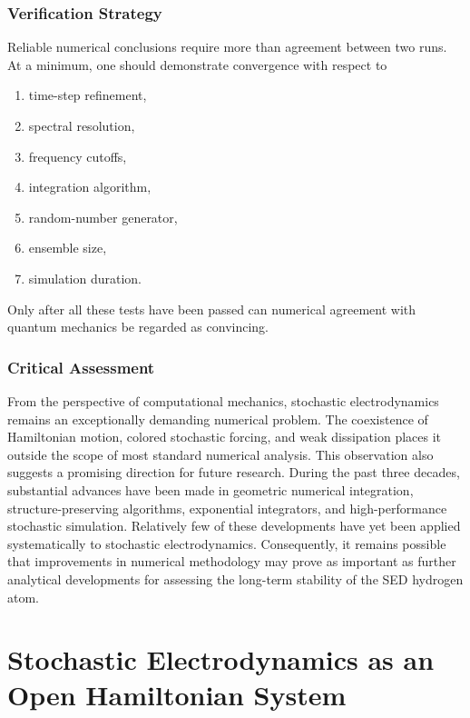 \subsection{Verification Strategy}
Reliable numerical conclusions require more than agreement between two
runs.
At a minimum,
one should demonstrate convergence with respect to
\begin{enumerate}
\item
time-step refinement,
\item
spectral resolution,
\item
frequency cutoffs,
\item
integration algorithm,
\item
random-number generator,
\item
ensemble size,
\item
simulation duration.
\end{enumerate}
Only after all these tests have been passed can numerical agreement with
quantum mechanics be regarded as convincing.
\subsection*{Critical Assessment}
From the perspective of computational mechanics, stochastic
electrodynamics remains an exceptionally demanding numerical problem.
The coexistence of Hamiltonian motion, colored stochastic forcing, and
weak dissipation places it outside the scope of most standard numerical
analysis.
This observation also suggests a promising direction for future
research. During the past three decades, substantial advances have been
made in geometric numerical integration, structure-preserving
algorithms, exponential integrators, and high-performance stochastic
simulation. Relatively few of these developments have yet been applied
systematically to stochastic electrodynamics.
Consequently, it remains possible that improvements in numerical
methodology may prove as important as further analytical developments
for assessing the long-term stability of the SED hydrogen atom.
\chapter{Stochastic Electrodynamics as an Open Hamiltonian System}
\label{ch:OpenHamiltonianSED}
